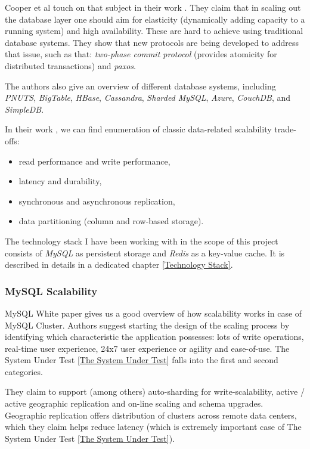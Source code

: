 \documentclass{uvamscse}
\begin{document}
Cooper et al touch on that subject in their work \cite{Ycsb}. They claim that in scaling out the database layer one should aim for elasticity (dynamically adding capacity to a running system) and high availability. These are hard to achieve using traditional database systems. They show that new protocols are being developed to address that issue, such as that: \textit{two-phase commit protocol} (provides atomicity for distributed transactions) and \textit{paxos}.


The authors \cite{Ycsb} also give an overview of different database systems, including \textit{PNUTS}, \textit{BigTable}, \textit{HBase}, \textit{Cassandra}, \textit{Sharded MySQL}, \textit{Azure}, \textit{CouchDB}, and \textit{SimpleDB}.


In their work \cite{Ycsb}, we can find enumeration of classic data-related scalability trade-offs:
\begin{itemize}
    \item read performance and write performance,
    \item latency and durability,
    \item synchronous and asynchronous replication,
    \item data partitioning (column and row-based storage).
  \end{itemize}


The technology stack I have been working with in the scope of this project consists of \textit{MySQL} as persistent storage and \textit{Redis} as a key-value cache. It is described in details in a dedicated chapter \ref{Technology Stack}.

\subsubsection{MySQL Scalability}

MySQL White paper \cite{MySQL} gives us a good overview of how scalability works in case of MySQL Cluster. Authors suggest starting the design of the scaling process by identifying which characteristic the application possesses: lots of write operations, real-time user experience, 24x7 user experience or agility and ease-of-use. The System Under Test \ref{The System Under Test} falls into the first and second categories.

They claim to support (among others) auto-sharding for write-scalability, active / active geographic replication and on-line scaling and schema upgrades.  Geographic replication offers distribution of clusters across remote data centers, which they claim helps reduce latency (which is extremely important case of The System Under Test \ref{The System Under Test}).
\end{document}
